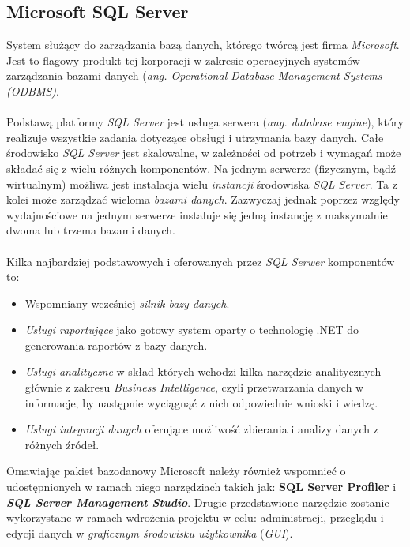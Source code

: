 \subsection{Microsoft SQL Server}
    System służący do zarządzania bazą danych, którego twórcą jest firma \textit{Microsoft}. Jest to flagowy produkt tej korporacji w zakresie operacyjnych systemów zarządzania bazami danych (\textit{ang. Operational Database Management Systems (ODBMS)}.\\
    \\
    Podstawą platformy \textit{SQL Server} jest usługa serwera (\textit{ang. database engine}), który realizuje wszystkie zadania dotyczące obsługi i utrzymania bazy danych. Całe środowisko \textit{SQL Server} jest skalowalne, w zależności od potrzeb i wymagań może składać się z wielu różnych komponentów. Na jednym serwerze (fizycznym, bądź wirtualnym)  możliwa jest instalacja wielu \textit{instancji} środowiska \textit{SQL Server}. Ta z kolei może zarządzać wieloma \textit{bazami danych}. Zazwyczaj jednak poprzez względy wydajnościowe na jednym serwerze instaluje się jedną instancję z maksymalnie dwoma lub trzema bazami danych.\\
    \\
    Kilka najbardziej podstawowych i oferowanych przez \textit{SQL Serwer} komponentów to:
    \begin{itemize}
        \item Wspomniany wcześniej \textit{silnik bazy danych}.
        \item \textit{Usługi raportujące} jako gotowy system oparty o technologię .NET do generowania raportów z bazy danych.
        \item \textit{Usługi analityczne} w skład których wchodzi kilka narzędzie analitycznych głównie z zakresu \textit{Business Intelligence}, czyli przetwarzania danych w informacje, by następnie wyciągnąć z nich odpowiednie wnioski i wiedzę.
        \item \textit{Usługi integracji danych} oferujące możliwość zbierania i analizy danych z różnych źródeł. 
    \end{itemize}
    Omawiając pakiet bazodanowy Microsoft należy również wspomnieć o udostępnionych w ramach niego narzędziach takich jak: \textbf{SQL Server Profiler} i \textit{\textbf{SQL Server Management Studio}}. Drugie przedstawione narzędzie zostanie wykorzystane w ramach wdrożenia projektu w celu: administracji, przeglądu i edycji danych w \textit{graficznym środowisku użytkownika} (\textit{GUI}).
    
